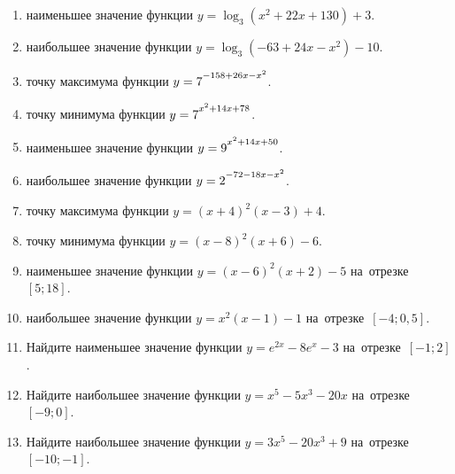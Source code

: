 \documentclass[a4paper,10pt]{article}
\begin{document}
\begin{enumerate}
\item {} наименьшее значение функции $y=\log_3\left(x^2+22x+130\right)+3$.

\item {} наибольшее значение функции $y=\log_3\left(-63+24x-x^2\right)-10$.

\item {} точку максимума функции $y=7\strut^{-158+26x-x^2}$.

\item {} точку минимума функции $y=7\strut^{x^2+14x+78}$.

\item {} наименьшее значение функции $y=9\strut^{x^2+14x+50}$.

\item {} наибольшее значение функции $y=2\strut^{-72-18x-x^2}$.

\item {} точку максимума функции $y=\left(x+4\right)^2\left(x-3\right)+4$.

\item {} точку минимума функции $y=\left(x-8\right)^2\left(x+6\right)-6$.

\item {} наименьшее значение функции $y=\left(x-6\right)^2\left(x+2\right)-5$ на~отрезке~$\left[5;18\right]$.

\item {} наибольшее значение функции $y=x^2\left(x-1\right)-1$ на~отрезке~$\left[-4;0{,}5\right]$.

\item Найдите наименьшее значение функции $y=e^{2x}-8e^x-3$ на~отрезке~$\left[-1;2\right]$.

\item Найдите наибольшее значение функции $y=x^5-5x^3-20x$ на~отрезке~$\left[-9;0\right]$.

\item Найдите наибольшее значение функции $y=3x^5-20x^3+9$ на~отрезке~$\left[-10;-1\right]$.

\end{enumerate}
\end{document}
